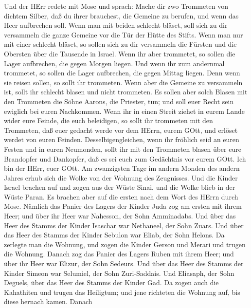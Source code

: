  Und der HErr redete mit Mose und sprach:  Mache
dir zwo Trommeten von dichtem Silber, daß du ihrer brauchest, die
Gemeine zu berufen, und wenn das Heer aufbrechen soll.  Wenn
man mit beiden schlecht bläset, soll sich zu dir versammeln die ganze
Gemeine vor die Tür der Hütte des Stifts.  Wenn man nur mit
einer schlecht bläset, so sollen sich zu dir versammeln die Fürsten und
die Obersten über die Tausende in Israel.  Wenn ihr aber
trommetet, so sollen die Lager aufbrechen, die gegen Morgen liegen.
 Und wenn ihr zum andernmal trommetet, so sollen die Lager
aufbrechen, die gegen Mittag liegen. Denn wenn sie reisen sollen, so
sollt ihr trommeten.  Wenn aber die Gemeine zu versammeln
ist, sollt ihr schlecht blasen und nicht trommeten.  Es
sollen aber solch Blasen mit den Trommeten die Söhne Aarons, die
Priester, tun; und soll euer Recht sein ewiglich bei euren Nachkommen.
 Wenn ihr in einen Streit ziehet in eurem Lande wider eure
Feinde, die euch beleidigen, so sollt ihr trommeten mit den Trommeten,
daß euer gedacht werde vor dem HErrn, eurem GOtt, und erlöset werdet von
euren Feinden.  Desselbigengleichen, wenn ihr fröhlich seid
an euren Festen und in euren Neumonden, sollt ihr mit den Trommeten
blasen über eure Brandopfer und Dankopfer, daß es sei euch zum
Gedächtnis vor eurem GOtt. Ich bin der HErr, euer GOtt.  Am
zwanzigsten Tage im andern Monden des andern Jahres erhub sich die Wolke
von der Wohnung des Zeugnisses.  Und die Kinder Israel
brachen auf und zogen aus der Wüste Sinai, und die Wolke blieb in der
Wüste Paran.  Es brachen aber auf die ersten nach dem Wort
des HErrn durch Mose.  Nämlich das Panier des Lagers der
Kinder Juda zog am ersten mit ihrem Heer; und über ihr Heer war
Nahesson, der Sohn Amminadabs.  Und über das Heer des
Stamms der Kinder Isaschar war Nethaneel, der Sohn Zuars. 
Und über das Heer des Stamms der Kinder Sebulon war Eliab, der Sohn
Helons.  Da zerlegte man die Wohnung, und zogen die Kinder
Gerson und Merari und trugen die Wohnung.  Danach zog das
Panier des Lagers Ruben mit ihrem Heer; und über ihr Heer war Elizur,
der Sohn Sedeurs.  Und über das Heer des Stamms der Kinder
Simeon war Selumiel, der Sohn Zuri-Saddais.  Und Eliasaph,
der Sohn Deguels, über das Heer des Stamms der Kinder Gad. 
Da zogen auch die Kahathiten und trugen das Heiligtum; und jene
richteten die Wohnung auf, bis diese hernach kamen.  Danach
